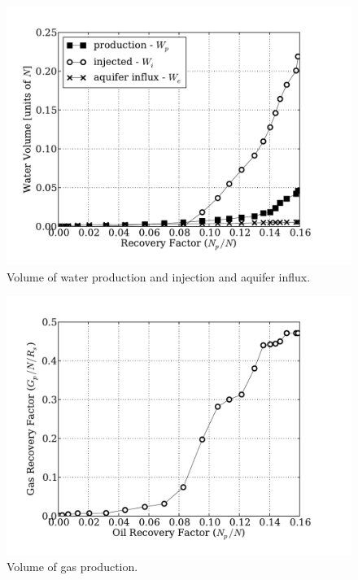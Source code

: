 \documentclass[authoryear,preprint,review,12pt]{elsarticle}
\begin{document}
\begin{figure}
\centering
\includegraphics[width=\linewidth]{./python/matbal_water}
\caption{Volume of water production and injection and aquifer influx.}
\label{fig: matbal_water}
\end{figure}

\begin{figure}
\centering
\includegraphics[width=\linewidth]{./python/matbal_gas}
\caption{Volume of gas production.}
\label{fig: matbal_gas}
\end{figure}
\end{document}
